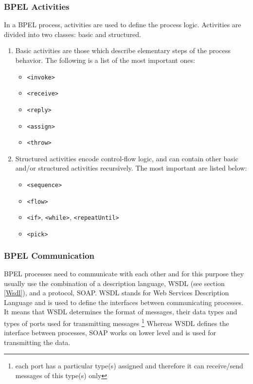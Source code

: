 \subsubsection{BPEL Activities} 
\label{BPELActivities}

In a BPEL process, activities are used to define the process logic. Activities are divided into two classes: basic and structured. 

\begin{enumerate}
\item Basic activities are those which describe elementary steps of the process behavior. The following is a list of the most important ones:
	\begin{itemize}
	\item \verb|<invoke>|
	\item \verb|<receive>|
	\item \verb|<reply>|
	\item \verb|<assign>|
	\item \verb|<throw>|
	\end{itemize}

\item Structured activities encode control-flow logic, and can contain other basic and/or structured activities recursively. The most important are listed below:
	\begin{itemize}
	\item \verb|<sequence>|
	\item \verb|<flow>|
	\item \verb|<if>|, \verb|<while>|, \verb|<repeatUntil>|  
	\item \verb|<pick>|
  \end{itemize}
\end{enumerate}


\subsubsection{BPEL Communication}
\label{BPELCommunication}
BPEL processes need to communicate with each other and for this purpose they usually use the combination of a description language, WSDL (see section \ref{Wsdl}), and a protocol, SOAP. WSDL stands for Web Services Description Language and is used to define the interfaces between communicating processes. It means that WSDL determines the format of messages, their data types and types of ports used for transmitting messages \footnote{each port has a particular type(s) assigned and therefore it can receive/send messages of this type(s) only} Whereas WSDL defines the interface between processes, SOAP works on lower level and is used for transmitting the data.

